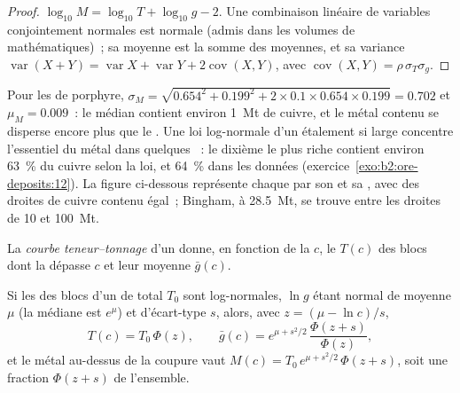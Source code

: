 \begin{proof}
$\log_{10} M = \log_{10} T + \log_{10} g - 2$. Une combinaison linéaire de variables conjointement
normales est normale (admis dans les volumes de mathématiques)~; sa moyenne est la somme des
moyennes, et sa variance $\operatorname{var}(X + Y) = \operatorname{var} X + \operatorname{var} Y + 2\operatorname{cov}(X, Y)$,
avec $\operatorname{cov}(X, Y) = \rho\,\sigma_T\sigma_g$.
\end{proof}

Pour les  de porphyre, $\sigma_M = \sqrt{0.654^2 + 0.199^2 + 2 \times 0.1 \times 0.654 \times
0.199} = 0.702$ et $\mu_M = 0.009$~: le  médian contient environ \qty{1}{Mt} de cuivre, et le métal contenu
se disperse encore plus que le . Une loi log-normale d'un étalement si large concentre l'essentiel du métal
dans quelques ~: le dixième le plus riche contient environ \qty{63}{\percent} du cuivre selon la loi, et
\qty{64}{\percent} dans les données (exercice~\ref{exo:b2:ore-deposits:12}). La figure ci-dessous représente chaque
 par son  et sa , avec des droites de cuivre contenu égal~; Bingham, à \qty{28.5}{Mt},
se trouve entre les droites de 10 et \qty{100}{Mt}.

\begin{definition}\label{def:b2:ore-deposits:gt}
La \emph{courbe teneur--tonnage} d'un 
donne, en fonction de la  $c$, le  $T(c)$ des
blocs dont la  dépasse $c$ et leur  moyenne $\bar g(c)$.
\end{definition}

\begin{proposition}\label{prop:b2:ore-deposits:gt}
Si les  des blocs d'un  de  total $T_0$ sont log-normales, $\ln g$ étant normal
de moyenne $\mu$ (la  médiane est $e^{\mu}$) et d'écart-type $s$, alors, avec $z = (\mu -
\ln c)/s$,
\begin{equation}
T(c) = T_0\,\Phi(z), \qquad
\bar g(c) = e^{\mu + s^2/2}\,\frac{\Phi(z + s)}{\Phi(z)} ,
\label{eq:b2:ore-deposits:gt}
\end{equation}
et le métal au-dessus de la coupure vaut $M(c) = T_0\,e^{\mu + s^2/2}\,\Phi(z + s)$, soit une fraction $\Phi(z +
s)$ de l'ensemble.
\end{proposition}

